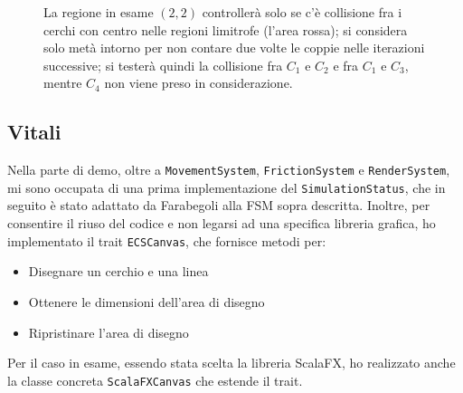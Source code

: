 \begin{figure}[H]
    \centering
    \caption{La regione in esame $(2, 2)$ controllerà solo se c'è collisione fra i cerchi con centro nelle regioni
    limitrofe (l'area rossa);
    si considera solo metà intorno per non contare due volte le coppie nelle iterazioni successive;
    si testerà quindi la collisione fra $C_1$ e $C_2$ e fra $C_1$ e $C_3$, mentre $C_4$ non viene preso in
    considerazione.}
    \label{fig:space-partition}
\end{figure}

\subsection{Vitali}\label{subsec:demo-vitali}
Nella parte di demo, oltre a \texttt{MovementSystem}, \texttt{FrictionSystem} e \texttt{RenderSystem},
mi sono occupata di una prima implementazione del \texttt{SimulationStatus}, che in seguito è stato adattato da
Farabegoli alla FSM sopra descritta.
Inoltre, per consentire il riuso del codice e non legarsi ad una specifica libreria grafica, ho
implementato il trait \texttt{ECSCanvas}, che fornisce metodi per:
\begin{itemize}
    \item Disegnare un cerchio e una linea
    \item Ottenere le dimensioni dell'area di disegno
    \item Ripristinare l'area di disegno
\end{itemize}
Per il caso in esame, essendo stata scelta la libreria ScalaFX, ho realizzato anche la classe concreta
\texttt{ScalaFXCanvas} che estende il trait.
